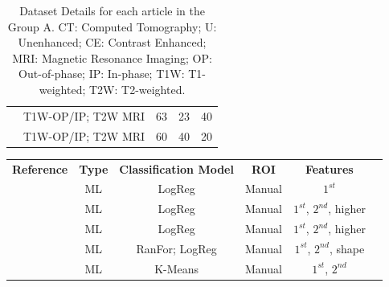 \documentclass{article}
\begin{document}
\begin{table}[]
\begin{tabular}{ccccc}
        \cite{Tu2020}                       & T1W-OP/IP; T2W MRI                       & 63                                                 & 23                & 40             \\
        \cite{Romeo2018}                    & T1W-OP/IP; T2W MRI                       & 60                                                 & 40                & 20
        \\\bottomrule
    \end{tabular}
    \caption{Dataset Details for each article in the Group A. CT: Computed Tomography; U: Unenhanced; CE: Contrast Enhanced; MRI: Magnetic Resonance Imaging; OP: Out-of-phase; IP: In-phase; T1W: T1-weighted; T2W: T2-weighted.}
    \label{tab:data_A}
\end{table}

\begin{table}[]
    \centering
    \begin{tabular}{cccccc}\toprule
        \multirow{2}{*}{\textbf{Reference}} & \multirow{2}{*}{\textbf{Type}} & \multirow{2}{*}{\textbf{Classification Model}} & \multirow{2}{*}{\textbf{ROI}} & \multirow{2}{*}{\textbf{Features}} \\
        \\\midrule
        \cite{Tu2018}                       & ML                             & LogReg                                         & Manual                        & $1^{st}$                           \\
        \cite{Yi20181}                      & ML                             &
        LogReg                              & Manual                         & $1^{st}$, $2^{nd}$, higher                                                                                          \\
        \cite{Yi2018}                       & ML                             &
        LogReg                              & Manual
                                            & $1^{st}$, $2^{nd}$, higher                                                                                                                           \\
        \cite{Elmohr2019}                   & ML                             & RanFor; LogReg                                 & Manual                        & $1^{st}$, $2^{nd}$, shape          \\
        \cite{Torresan2021}                 & ML                             & K-Means                                        & Manual                        & $1^{st}$, $2^{nd}$                 \\

\end{tabular}
\end{table}
\end{document}
